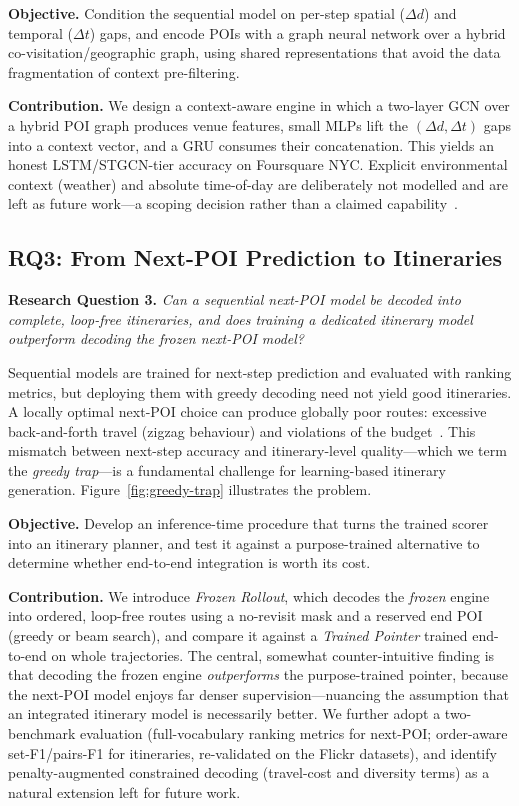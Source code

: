 \textbf{Objective.} Condition the sequential model on per-step spatial ($\Delta d$) and temporal ($\Delta t$) gaps, and encode POIs with a graph neural network over a hybrid co-visitation/geographic graph, using shared representations that avoid the data fragmentation of context pre-filtering.

\textbf{Contribution.} We design a context-aware engine in which a two-layer GCN over a hybrid POI graph produces venue features, small MLPs lift the $(\Delta d,\Delta t)$ gaps into a context vector, and a GRU consumes their concatenation. This yields an honest LSTM/STGCN-tier accuracy on Foursquare NYC. Explicit environmental context (weather) and absolute time-of-day are deliberately not modelled and are left as future work---a scoping decision rather than a claimed capability~\cite{villegas2018cars, raza2019cars}.

\subsection{RQ3: From Next-POI Prediction to Itineraries}
\label{sec:intro-rq3}

\textbf{Research Question 3.} \textit{Can a sequential next-POI model be decoded into complete, loop-free itineraries, and does training a dedicated itinerary model outperform decoding the frozen next-POI model?}

\medskip

Sequential models are trained for next-step prediction and evaluated with ranking metrics, but deploying them with greedy decoding need not yield good itineraries. A locally optimal next-POI choice can produce globally poor routes: excessive back-and-forth travel (zigzag behaviour) and violations of the budget~\cite{wu2025trajectory}. This mismatch between next-step accuracy and itinerary-level quality---which we term the \emph{greedy trap}---is a fundamental challenge for learning-based itinerary generation. Figure~\ref{fig:greedy-trap} illustrates the problem.



\textbf{Objective.} Develop an inference-time procedure that turns the trained scorer into an itinerary planner, and test it against a purpose-trained alternative to determine whether end-to-end integration is worth its cost.

\textbf{Contribution.} We introduce \emph{Frozen Rollout}, which decodes the \emph{frozen} engine into ordered, loop-free routes using a no-revisit mask and a reserved end POI (greedy or beam search), and compare it against a \emph{Trained Pointer} trained end-to-end on whole trajectories. The central, somewhat counter-intuitive finding is that decoding the frozen engine \emph{outperforms} the purpose-trained pointer, because the next-POI model enjoys far denser supervision---nuancing the assumption that an integrated itinerary model is necessarily better. We further adopt a two-benchmark evaluation (full-vocabulary ranking metrics for next-POI; order-aware set-F1/pairs-F1 for itineraries, re-validated on the Flickr datasets), and identify penalty-augmented constrained decoding (travel-cost and diversity terms) as a natural extension left for future work.


